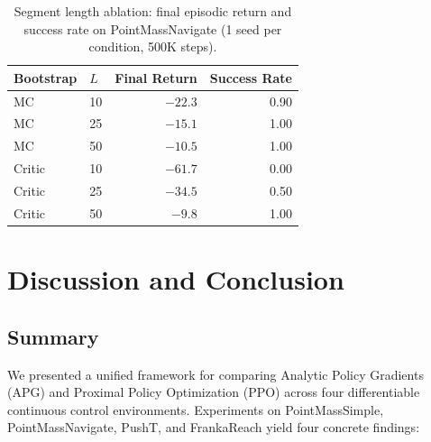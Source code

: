 \documentclass[11pt,a4paper]{article}
\begin{document}
\begin{table}[htbp]
  \centering
  \caption{Segment length ablation: final episodic return and success rate on PointMassNavigate (1 seed per condition, 500K steps).}
  \label{tab:ablation_segment}
  \begin{tabular}{@{}llrr@{}}
    \toprule
    \textbf{Bootstrap} & \textbf{$L$} & \textbf{Final Return} & \textbf{Success Rate} \\
    \midrule
    MC     & 10 & $-22.3$ & 0.90 \\
    MC     & 25 & $-15.1$ & 1.00 \\
    MC     & 50 & $-10.5$ & 1.00 \\
    \midrule
    Critic & 10 & $-61.7$ & 0.00 \\
    Critic & 25 & $-34.5$ & 0.50 \\
    Critic & 50 & $-9.8$  & 1.00 \\
    \bottomrule
  \end{tabular}
\end{table}

\section{Discussion and Conclusion}
\label{sec:conclusion}

\subsection{Summary}
\label{sec:summary}

We presented a unified framework for comparing Analytic Policy Gradients (APG) and Proximal Policy Optimization (PPO) across four differentiable continuous control environments. Experiments on PointMassSimple, PointMassNavigate, PushT, and FrankaReach yield four concrete findings:
\end{document}
